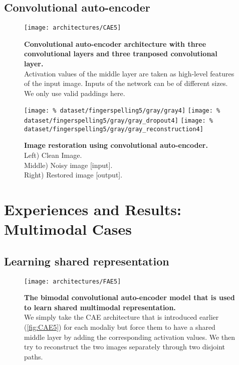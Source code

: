\subsection{Convolutional auto-encoder}

\begin{figure}[H]
  \centering
  \texttt{[image: architectures/CAE5]}\\[-2.5em]
  \caption{%
    \textbf{Convolutional auto-encoder architecture with 
      three convolutional layers and three tranposed convolutional
      layer.}\\[0.1em]
    Activation values of the middle layer are taken as 
      high-level features of the input image. Inputs of the network
      can be of different sizes. We only use valid paddings here.}
  \label{fig:CAE5}
\end{figure}

\begin{figure}[H]
  \centering
  \hfill
  \texttt{[image: \%
    dataset/fingerspelling5/gray/gray4]}
  \hfill
  \texttt{[image: \%
    dataset/fingerspelling5/gray/gray\_dropout4]}
  \hfill
  \texttt{[image: \%
    dataset/fingerspelling5/gray/gray\_reconstruction4]}
  \caption{%
    \textbf{Image restoration using convolutional auto-encoder.}\\[0.1em]
      Left) Clean Image.\\[0.1em]
      Middle) Noisy image [input].\\[0.1em]
      Right) Restored image [output].}
  \label{fig:image_restoration}
\end{figure}

\section{Experiences and Results: Multimodal Cases}

\subsection{Learning shared representation}

\begin{figure}[H]
  \centering
  \texttt{[image: architectures/FAE5]}\\[-2.5em]
  \caption{%
    \textbf{The bimodal convolutional auto-encoder model that is
      used to learn shared multimodal representation.}\\[0.1em]
    We simply take the CAE architecture that is introduced earlier
      (\autoref{fig:CAE5}) for each modaliy but force them to have a
      shared middle layer by adding the corresponding activation values.
      We then try to reconstruct the two images separately through
      two disjoint paths.}
  \label{fig:FAE5}
\end{figure}

